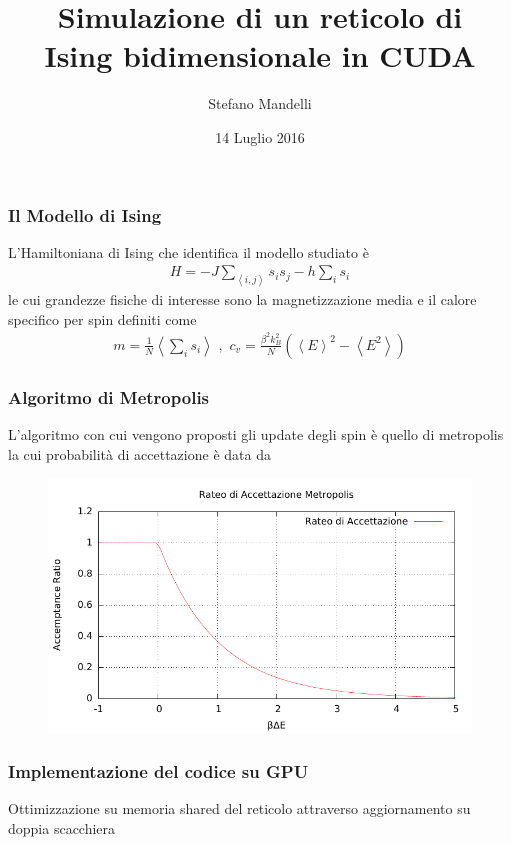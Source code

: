 \documentclass{beamer}
\title[Simulazione Ising 2D]
{Simulazione di un reticolo di \\ Ising bidimensionale in CUDA}
\author{Stefano Mandelli}
\date{14 Luglio 2016}
\begin{document}

	\begin{frame}
 		\maketitle
	\end{frame}
 


	\begin{frame}
		\frametitle{Il Modello di Ising}
		L'Hamiltoniana di Ising che identifica il modello studiato \`e
		\begin{eqnarray}
			H = -J \sum_{\left\langle i,j \right\rangle} s_i s_j -h\sum_i s_i
		\end{eqnarray}
		le cui grandezze fisiche di interesse sono la magnetizzazione media e il calore specifico per spin definiti come
		\begin{eqnarray}
			m=\frac{1}{N}\left\langle \sum_i s_i\right\rangle \,\,,\,\, c_v = \frac{\beta^2 k_B^2}{N} \left(\left\langle E\right\rangle^2 - \left\langle E^2\right\rangle \right)
		\end{eqnarray}
	\end{frame}

	\begin{frame}
		\frametitle{Algoritmo di Metropolis}
		L'algoritmo con cui vengono proposti gli update degli spin \`e quello di metropolis la cui probabilit\`a di accettazione \`e data da
		\begin{figure}
			\includegraphics[scale=0.85]{../acc_rat.pdf}
		\end{figure}
	\end{frame}

	
	\begin{frame}
		\frametitle{Implementazione del codice su GPU}
		Ottimizzazione su memoria shared del reticolo attraverso aggiornamento su doppia scacchiera
		
	\end{frame}
\end{document}

